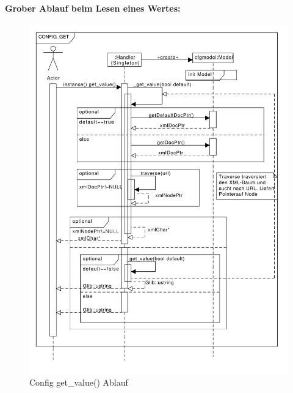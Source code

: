 \paragraph{Grober Ablauf beim Lesen eines Wertes:}
\begin{figure}
    \centering
    \includegraphics[scale=0.5]{./gfx/seq/config_get}
    \caption{Config get\_value() Ablauf}
    \label{c_configget}
\end{figure}
